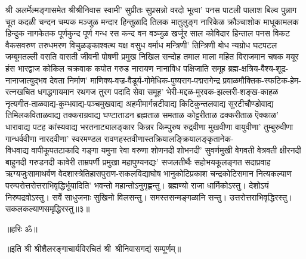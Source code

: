 \begin{flushleft}
श्री अलर्मेल्मङ्गासमेत श्रीश्रीनिवास स्वामी' सुप्रीतः सुप्रसन्नो वरदो
भूत्वा' पनस पाटली पालाश बिल्व पुन्नाग चूत कदळी चन्दन
चम्पक मञ्जुळ मन्दार हिन्तुळादि तिलक मातुलुङ्ग नारिकेळ
क्रौञ्चाशोक माधूकामलक हिन्दुक नागकेतक पूर्णकुन्द पूर्ण गन्ध रस
कन्द वन वञ्जुळ खर्जूर साल कोविदार हिन्ताल पनस विकट
वैकसवरुण तरुधमरण विचुळङ्काश्वत्थ यक्ष वसुध वर्माध मन्त्रिणी'
तिन्त्रिणी बोध न्यग्रोध घटपटल जम्बूमतल्ली वसति वासती जीवनी
पोषणी प्रमुख निखिल सन्दोह तमाल माला महित विराजमान चषक
मयूर हंस भारद्वाज कोकिल चक्रवाक कपोत गरुड नारायण नानाविध पक्षिजाति समूह ब्रह्म-क्षत्रिय-वैश्य-शूद्र-नानाजात्युद्भव देवता
निर्माण' माणिक्य-वज्र-वैडूर्य-गोमेधिक-पुष्यराग-पद्मरागेन्द्र प्रवाळमौक्तिक-स्फटिक-हेम-रत्नखचित धगद्धगायमान रथगज
तुरग पदादि सेवा समूह' भेरी-मद्दळ-मुरवक-झल्लरी-शङ्ख-काहळ नृत्यगीत-ताळवाद्य-कुम्भवाद्य-पञ्चमुखवाद्य अहमीमार्गन्नटीवाद्य किटिकुन्तलवाद्य सुरटीचौण्डोवाद्य तिमिलकविताळवाद्य
तक्कराग्रवाद्य घण्टाताडन ब्रह्मताळ समताळ कोट्टरीताळ ढक्करीताळ ऎक्काळ' धारावाद्य पटह कांस्यवाद्य भरतनाट्यालङ्कार किन्नर किम्पुरुष
रुद्रवीणा मुखवीणा वायुवीणा' तुम्बुरुवीणा गान्धर्ववीणा नारदवीणा' स्वरमण्डल रावणहस्तवीणास्तक्रियालङ्क्रियालङ्कृतानेक-\\विधवाद्य वापीकूपतटाकादि गङ्गा यमुना रेवा वरुणा शोणनदी शोभनदी'
सुवर्णमुखी वेगवती वेत्रवती क्षीरनदी बाहुनदी गरुडनदी कावेरी ताम्रपर्णी प्रमुखा महापुण्यनद्यः' सजलतीर्थैः सहोभयकूलङ्गत सदाप्रवाह ऋग्यजुःसामाथर्वण वेदशास्त्रेतिहासपुराण-सकलविद्याघोष भानुकोटिप्रकाश चन्द्रकोटिसमान नित्यकल्याण परम्परोत्तरोत्तराभिवृद्धिर्भूयादिति' भवन्तो महान्तोऽनुगृह्णन्तु। 
ब्रह्मण्यो राजा धार्मिकोऽस्तु। देशोऽयं निरुपद्रवोऽस्तु।
सर्वे साधुजनाः सुखिनो विलसन्तु। समस्तसन्मङ्गळानि सन्तु। उत्तरोत्तराभिवृद्धिरस्तु। सकलकल्याणसमृद्धिरस्तु॥३॥
\centerline{॥हरिः ॐ॥}
\centerline{॥इति श्री श्रीशैलरङ्गाचार्यविरचितं श्री~श्रीनिवासगद्यं सम्पूर्णम्॥}

\closesection
\end{flushleft}